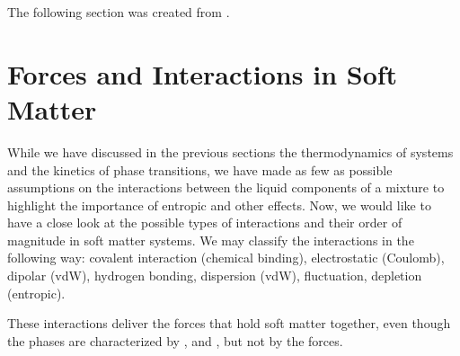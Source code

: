 \documentclass[letterpaper,10pt,english]{sphinxmanual}
\begin{document}
\sphinxAtStartPar
The following section was created from .


\chapter{Forces and Interactions in Soft Matter}
\label{\detokenize{notebooks/L7/1_Forces and Interactions:Forces-and-Interactions-in-Soft-Matter}}\label{\detokenize{notebooks/L7/1_Forces and Interactions::doc}}
\sphinxAtStartPar
While we have discussed in the previous sections the thermodynamics of systems and the kinetics of phase transitions, we have made as few as possible assumptions on the interactions between the liquid components of a mixture to highlight the importance of entropic and other effects. Now, we would like to have a close look at the possible types of interactions and their order of magnitude in soft matter systems. We may classify the interactions in the following way: \sphinxhyphen{} covalent interaction
(chemical binding), \sphinxhyphen{} electrostatic (Coulomb), \sphinxhyphen{} dipolar (vdW), \sphinxhyphen{} hydrogen bonding, \sphinxhyphen{} dispersion (vdW), \sphinxhyphen{} fluctuation, depletion (entropic).

\sphinxAtStartPar
These interactions deliver the forces that hold soft matter together, even though the phases are characterized by ,  and , but not by the forces.
\end{document}
